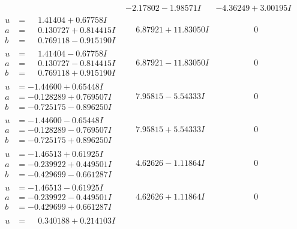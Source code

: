 \documentclass[1p]{elsarticle_modified}
\theoremstyle{definition}
\begin{document}
$$\begin{array}{c|c|c}
 & -2.17802 - 1.98571 I & -4.36249 + 3.00195 I \\ \hline\begin{aligned}
u &= \phantom{-}1.41404 + 0.67758 I \\
a &= \phantom{-}0.130727 + 0.814415 I \\
b &= \phantom{-}0.769118 - 0.915190 I\end{aligned}
 & \phantom{-}6.87921 + 11.83050 I & \phantom{-0.000000 } 0 \\ \hline\begin{aligned}
u &= \phantom{-}1.41404 - 0.67758 I \\
a &= \phantom{-}0.130727 - 0.814415 I \\
b &= \phantom{-}0.769118 + 0.915190 I\end{aligned}
 & \phantom{-}6.87921 - 11.83050 I & \phantom{-0.000000 } 0 \\ \hline\begin{aligned}
u &= -1.44600 + 0.65448 I \\
a &= -0.128289 + 0.769507 I \\
b &= -0.725175 - 0.896250 I\end{aligned}
 & \phantom{-}7.95815 - 5.54333 I & \phantom{-0.000000 } 0 \\ \hline\begin{aligned}
u &= -1.44600 - 0.65448 I \\
a &= -0.128289 - 0.769507 I \\
b &= -0.725175 + 0.896250 I\end{aligned}
 & \phantom{-}7.95815 + 5.54333 I & \phantom{-0.000000 } 0 \\ \hline\begin{aligned}
u &= -1.46513 + 0.61925 I \\
a &= -0.239922 + 0.449501 I \\
b &= -0.429699 - 0.661287 I\end{aligned}
 & \phantom{-}4.62626 - 1.11864 I & \phantom{-0.000000 } 0 \\ \hline\begin{aligned}
u &= -1.46513 - 0.61925 I \\
a &= -0.239922 - 0.449501 I \\
b &= -0.429699 + 0.661287 I\end{aligned}
 & \phantom{-}4.62626 + 1.11864 I & \phantom{-0.000000 } 0 \\ \hline\begin{aligned}
u &= \phantom{-}0.340188 + 0.214103 I \\

\end{aligned}
\end{array}$$
\end{document}
